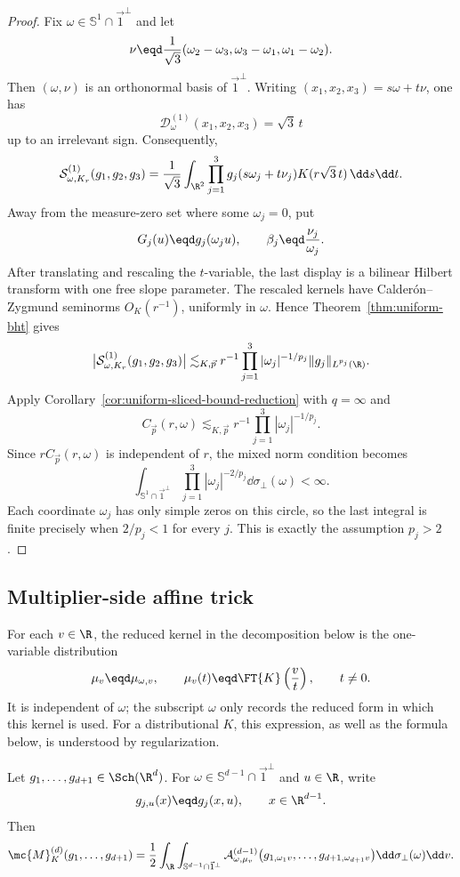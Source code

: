 \begin{proof}
Fix $\omega\in\mathbb{S}^1\cap\vec{1}^{\perp}$ and let
\[
\nu\eqd\frac1{\sqrt3} (\omega_2-\omega_3,\omega_3-\omega_1,\omega_1-\omega_2).
\]
Then $(\omega,\nu)$ is an orthonormal basis of $\vec{1}^{\perp}$. Writing
$(x_1,x_2,x_3)=s\omega+t\nu$, one has
\[
\mathcal D_\omega^{(1)}(x_1,x_2,x_3)=\sqrt3\,t
\]
up to an irrelevant sign. Consequently,
\[
\mathcal S_{\omega,K_r}^{(1)}(g_1,g_2,g_3) =\frac1{\sqrt3}\int_{\R^2}\prod_{j=1}^3g_j(s\omega_j+t\nu_j) K(r\sqrt3\,t)\,\dd s\dd t.
\]
Away from the measure-zero set where some $\omega_j=0$, put
\[
G_j(u)\eqd g_j(\omega_ju),   \qquad \beta_j\eqd\frac{\nu_j}{\omega_j}.
\]
After translating and rescaling the $t$-variable, the last display is a
bilinear Hilbert transform with one free slope parameter.
The rescaled kernels have Calderón--Zygmund seminorms $O_K(r^{-1})$, uniformly in $\omega$.
Hence Theorem~\ref{thm:uniform-bht} gives
\[
\bigl|\mathcal S_{\omega,K_r}^{(1)}(g_1,g_2,g_3)\bigr| \lesssim_{K,\vec p}r^{-1} \prod_{j=1}^3|\omega_j|^{-1/p_j}\|g_j\|_{L^{p_j}(\R)}.
\]
Apply Corollary~\ref{cor:uniform-sliced-bound-reduction} with $q=\infty$ and
\[
C_{\vec p}(r,\omega)\lesssim_{K,\vec p} r^{-1}\prod_{j=1}^3|\omega_j|^{-1/p_j}.
\]
Since $rC_{\vec p}(r,\omega)$ is independent of $r$, the mixed norm condition becomes
\[
\int_{\mathbb{S}^1\cap\vec{1}^{\perp}} \prod_{j=1}^3|\omega_j|^{-2/p_j}\dd\sigma_\perp(\omega)<\infty.
\]
Each coordinate $\omega_j$ has only simple zeros on this circle, so the last integral is finite precisely when $2/p_j<1$ for every $j$.
This is exactly the assumption $p_j>2$.
\end{proof}

\subsection{Multiplier-side affine trick}
For each $v\in\R$, the reduced kernel in the decomposition below is the
one-variable distribution
\[
  \mu_v\eqd\mu_{\omega,v},
  \qquad
  \mu_v(t)\eqd\FT{K}\left(\frac vt\right),\qquad t\ne0.
\]
It is independent of $\omega$; the subscript $\omega$ only records the reduced form
in which this kernel is used.  For a distributional $K$, this expression,
as well as the formula below, is understood by regularization.

\begin{proposition}
\label{prop:multiplier-affine-trick}
Let $g_1,\ldots,g_{d+1}\in\Sch(\R^d)$.  For
$\omega\in\mathbb S^{d-1}\cap\vec1^\perp$ and $u\in\R$,
write
\[
  g_{j,u}(x)\eqd g_j(x,u),\qquad x\in\R^{d-1}.
\]
Then
\[
\mc{M}_K^{(d)}(g_1,\ldots,g_{d+1}) =\frac12\int_\R \int_{\mathbb S^{d-1}\cap\vec1^\perp}\mathcal A_{\omega,\mu_v}^{(d-1)} \bigl(g_{1,\omega_1v},\ldots,g_{d+1,\omega_{d+1}v}\bigr) \dd\sigma_\perp(\omega) \dd v.
\]
\end{proposition}

